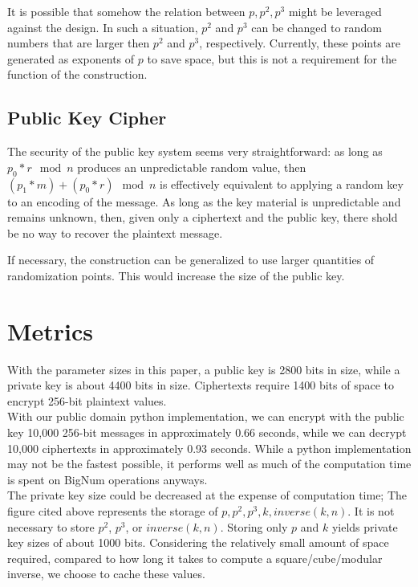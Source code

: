 \documentclass[preprint]{iacrtrans}
\begin{document}
It is possible that somehow the relation between $p, p ^ 2, p ^3$ might be leveraged against the design. In such a situation, $p ^ 2$ and $p ^ 3$ can be changed to random numbers that are larger then $p ^ 2$ and $p ^ 3$, respectively. Currently, these points are generated as exponents of $p$ to save space, but this is not a requirement for the function of the construction.

\subsection{Public Key Cipher}
The security of the public key system seems very straightforward: as long as $p_0 * r \mod n$ produces an unpredictable random value, then $(p_1 * m) + (p_0 * r) \mod n$ is effectively equivalent to applying a random key to an encoding of the message. As long as the key material is unpredictable and remains unknown, then, given only a ciphertext and the public key, there shold be no way to recover the plaintext message.

If necessary, the construction can be generalized to use larger quantities of randomization points. This would increase the size of the public key.

\section{Metrics}
With the parameter sizes in this paper, a public key is 2800 bits in size, while a private key is about 4400 bits in size. Ciphertexts require 1400 bits of space to encrypt 256-bit plaintext values. \\

With our public domain python implementation, we can encrypt with the public key 10,000 256-bit messages in approximately 0.66 seconds, while we can decrypt 10,000 ciphertexts in approximately 0.93 seconds. While a python implementation may not be the fastest possible, it performs well as much of the computation time is spent on BigNum operations anyways.\\

The private key size could be decreased at the expense of computation time; The figure cited above represents the storage of $p, p ^ 2, p ^ 3, k, inverse(k, n)$. It is not necessary to store $p ^ 2$, $p ^ 3$, or $inverse(k, n)$. Storing only $p$ and $k$ yields private key sizes of about 1000 bits. Considering the relatively small amount of space required, compared to how long it takes to compute a square/cube/modular inverse, we choose to cache these values.
\end{document}
